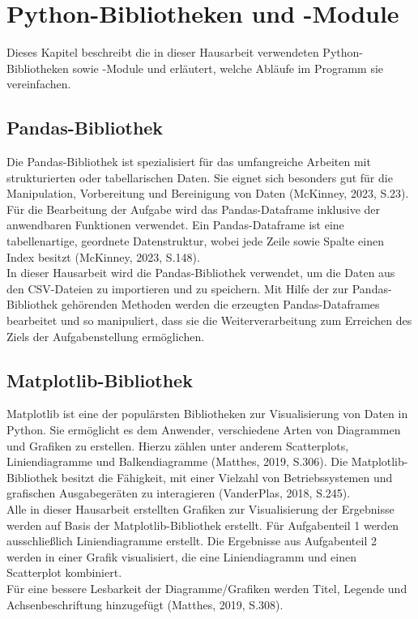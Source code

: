 \documentclass[11pt,a4paper]{scrreprt}
\begin{document}
\chapter{Python-Bibliotheken und -Module}
Dieses Kapitel beschreibt die in dieser Hausarbeit verwendeten Python-Bibliotheken sowie -Module und erläutert, welche Abläufe im Programm sie vereinfachen.
\section{Pandas-Bibliothek}
\label{sec:Pandas}
Die Pandas-Bibliothek ist spezialisiert für das umfangreiche Arbeiten mit strukturierten oder tabellarischen Daten. Sie eignet sich besonders gut für die Manipulation, Vorbereitung und Bereinigung von Daten (McKinney, 2023, S.23).\\
Für die Bearbeitung der Aufgabe wird das Pandas-Dataframe inklusive der anwendbaren Funktionen verwendet. Ein Pandas-Dataframe ist eine tabellenartige, geordnete Datenstruktur, wobei jede Zeile sowie Spalte einen Index besitzt (McKinney, 2023, S.148).\\
In dieser Hausarbeit wird die Pandas-Bibliothek verwendet, um die Daten aus den CSV-Dateien zu importieren und zu speichern. Mit Hilfe der zur Pandas-Bibliothek gehörenden Methoden werden die erzeugten Pandas-Dataframes bearbeitet und so manipuliert, dass sie die Weiterverarbeitung zum Erreichen des Ziels der Aufgabenstellung ermöglichen. 
\section{Matplotlib-Bibliothek}
Matplotlib ist eine der populärsten Bibliotheken zur Visualisierung von Daten in Python. Sie ermöglicht es dem Anwender, verschiedene Arten von Diagrammen und Grafiken zu erstellen. Hierzu zählen unter anderem Scatterplots, Liniendiagramme und Balkendiagramme (Matthes, 2019, S.306). Die Matplotlib-Bibliothek besitzt die Fähigkeit, mit einer Vielzahl von Betriebssystemen und grafischen Ausgabegeräten zu interagieren (VanderPlas, 2018, S.245).\\
Alle in dieser Hausarbeit erstellten Grafiken zur Visualisierung der Ergebnisse werden auf Basis der Matplotlib-Bibliothek erstellt. Für Aufgabenteil 1 werden ausschließlich Liniendiagramme erstellt. Die Ergebnisse aus Aufgabenteil 2 werden in einer Grafik visualisiert, die eine Liniendiagramm und einen Scatterplot kombiniert. \\
Für eine bessere Lesbarkeit der Diagramme/Grafiken werden Titel, Legende und Achsenbeschriftung hinzugefügt (Matthes, 2019, S.308).
\end{document}
